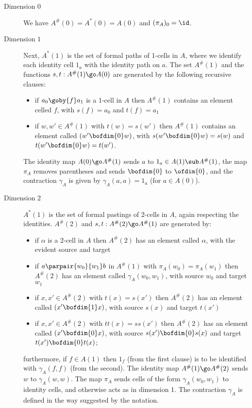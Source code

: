 \begin{description}
\item[Dimension $0$] We have $A^\#(0) = A^*(0) = A(0)$  and $(\pi_A)_0
= \id$.
%
\item[Dimension $1$] Next, $A^*(1)$ is the set of formal paths of 1-cells in
$A$, where we identify each identity cell $1_a$ with the identity path on
$a$.  The set $A^\#(1)$ and the functions $s,t: A^\#(1) \go A(0)$ are generated
by the following recursive clauses:
\begin{itemize}
\item if $a_0 \goby{f} a_1$ is a 1-cell in $A$ then $A^\#(1)$ contains an
element celled $f$, with $s(f)=a_0$ and $t(f)=a_1$
\item if $w,w' \in A^\#(1)$ with $t(w)=s(w')$ then $A^\#(1)$ contains an
element called $(w' \bofdim{0} w)$, with $s(w' \bofdim{0} w)=s(w)$ and $t(w'
\bofdim{0} w)=t(w')$. 
\end{itemize}
The identity map $A(0) \go A^\#(1)$ sends $a$ to $1_a \in A(1) \sub A^\#(1)$,
the map $\pi_A$ removes parentheses and sends $\bofdim{0}$ to $\ofdim{0}$,
and the contraction $\gamma_A$ is given by $\gamma_A(a,a) = 1_a$ (for $a\in
A(0)$).
%
\item[Dimension $2$] $A^*(1)$ is the set of formal pastings of
2-cells in $A$, again respecting the identities.  $A^\#(2)$ and $s, t:
A^\#(2) \go A^\#(1)$ are generated by:
\begin{itemize}
\item if $\alpha$ is a 2-cell in $A$ then $A^\#(2)$ has an element
called $\alpha$, with the evident source and target
\item if $a \parpair{w_0}{w_1} b$ in $A^\#(1)$ with $\pi_A(w_0)=\pi_A(w_1)$
then $A^\#(2)$ has an element called $\gamma_A(w_0,w_1)$, with source $w_0$ and
target $w_1$
\item if $x,x' \in A^\#(2)$ with $t(x)=s(x')$ then $A^\#(2)$ has an
element called $(x' \bofdim{1} x)$, with source $s(x)$ and target $t(x')$
\item if $x,x' \in A^\#(2)$ with $tt(x)=ss(x')$ then $A^\#(2)$ has an element
called $(x' \bofdim{0} x)$, with source $s(x')\bofdim{0} s(x)$ and target
$t(x')\bofdim{0} t(x)$;
\end{itemize}
furthermore, if $f \in A(1)$ then $1_f$ (from the first clause) is to be
identified with $\gamma_A(f,f)$ (from the second).  The identity map $A^\#(1)
\go A^\#(2)$ sends $w$ to $\gamma_A(w,w)$.  The map $\pi_A$ sends cells of
the form $\gamma_A(w_0,w_1)$ to identity cells, and otherwise acts as in
dimension 1.  The contraction $\gamma_A$ is defined in the way suggested by
the notation.

\end{description}


